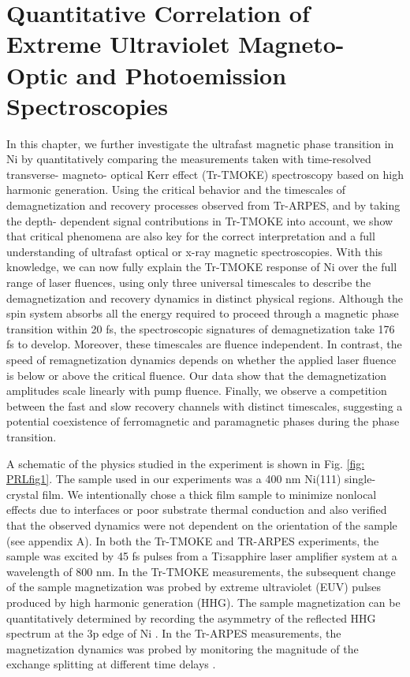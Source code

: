 \chapter{Quantitative Correlation of Extreme Ultraviolet Magneto-Optic and Photoemission Spectroscopies}
\label{PRLchap}
In this chapter, we further investigate the ultrafast magnetic phase transition in Ni by quantitatively comparing the measurements taken with time-resolved transverse- magneto- optical Kerr effect (Tr-TMOKE) spectroscopy based on high harmonic generation. Using the critical behavior and the timescales of demagnetization and recovery processes observed from Tr-ARPES, and by taking the depth- dependent signal contributions in Tr-TMOKE into account, we show that critical phenomena are also key for the correct interpretation and a full understanding of ultrafast optical or x-ray magnetic spectroscopies. With this knowledge, we can now fully explain the Tr-TMOKE response of Ni over the full range of laser fluences, using only three universal timescales to describe the demagnetization and recovery dynamics in distinct physical regions. Although the spin system absorbs all the energy required to proceed through a magnetic phase transition within 20 fs, the spectroscopic signatures of demagnetization take 176 fs to develop. Moreover, these timescales are fluence independent. In contrast, the speed of remagnetization dynamics depends on whether the applied laser fluence is below or above the critical fluence. Our data show that the demagnetization amplitudes scale linearly with pump fluence. Finally, we observe a competition between the fast and slow recovery channels with distinct timescales, suggesting a potential coexistence of ferromagnetic and paramagnetic phases during the phase transition.

A schematic of the physics studied in the experiment is shown in Fig. \ref{fig: PRLfig1}. The sample used in our experiments was a 400 nm Ni(111) single-crystal film. We intentionally chose a thick film sample to minimize nonlocal effects due to interfaces or poor substrate thermal conduction \cite{Turgut2013,Rudolf2012} and also verified that the observed dynamics were not dependent on the orientation of the sample (see appendix A). In both the Tr-TMOKE and TR-ARPES experiments, the sample was excited by 45 fs pulses from a Ti:sapphire laser amplifier system at a wavelength of 800 nm. In the Tr-TMOKE measurements, the subsequent change of the sample magnetization was probed by extreme ultraviolet (EUV) pulses produced by high harmonic generation (HHG). The sample magnetization can be quantitatively determined by recording the asymmetry of the reflected HHG spectrum at the 3p edge of Ni \cite{La-O-Vorakiat2009,Mathias2012,Turgut2016}. In the Tr-ARPES measurements, the magnetization dynamics was probed by monitoring the magnitude of the exchange splitting at different time delays \cite{Carley2012,Rhie2003,Tengdin2018}.

